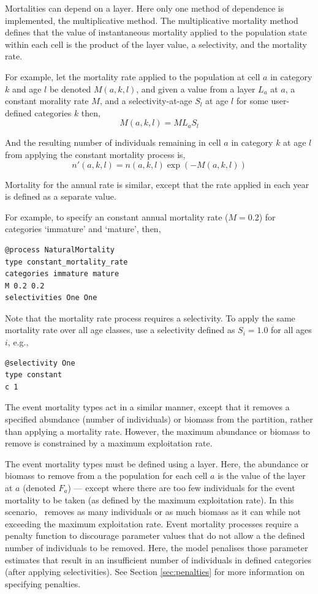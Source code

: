 Mortalities can depend on a layer. Here only one method of dependence is implemented, the multiplicative method. The multiplicative  mortality method defines that the value of instantaneous mortality applied to the population state within each cell is the product of the layer value, a selectivity, and the mortality rate.

For example, let the mortality rate applied to the population at cell $a$ in category $k$ and age $l$ be denoted $M(a,k,l)$, and given a value from a layer $L_a$  at $a$, a constant morality rate $M$, and a selectivity-at-age $S_l$ at age $l$ for some user-defined categories $k$ then, 
\begin{equation}
  M(a,k,l) = ML_a S_l 
\end{equation}

And the resulting number of individuals remaining in cell $a$ in category $k$ at age $l$ from applying the constant mortality process is,
\begin{equation}
  n'(a,k,l) = n(a,k,l) \exp \left({-M(a,k,l)}\right)
\end{equation}

Mortality for the annual rate is similar, except that the rate applied in each year is defined as a separate value. 

For example, to specify an constant annual mortality rate ($M=0.2$) for categories `immature' and `mature', then, 

\begin{verbatim}
@process NaturalMortality
type constant_mortality_rate
categories immature mature
M 0.2 0.2
selectivities One One
\end{verbatim}

Note that the mortality rate process requires a selectivity. To apply the same mortality rate over all age classes, use a selectivity defined as $S_i=1.0$ for all ages $i$, e.g.,

\begin{verbatim}
@selectivity One
type constant
c 1
\end{verbatim}

The event mortality types act in a similar manner, except that it removes a specified abundance (number of individuals) or biomass from the partition, rather than applying a mortality rate. However, the maximum abundance or biomass to remove is constrained by a maximum exploitation rate.

The event mortality types must be defined using a layer. Here, the abundance or biomass to remove from a the population for each cell $a$ is the value of the layer at $a$ (denoted $F_a$) --- except where there are too few individuals for the event mortality to be taken (as defined by the maximum exploitation rate). In this scenario, \SPM\ removes as many individuals or as much biomass as it can while not exceeding the maximum exploitation rate. Event mortality processes require a penalty function to discourage parameter values that do not allow a the defined number of individuals to be removed. Here, the model penalises those parameter estimates that result in an insufficient number of individuals in defined categories (after applying selectivities). See Section \ref{sec:penalties} for more information on specifying penalties.


